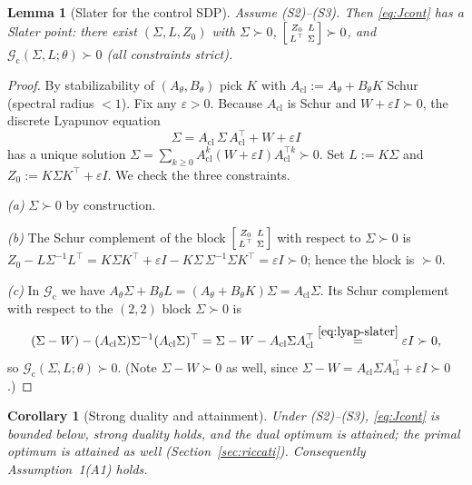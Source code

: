 \documentclass[11pt]{article}
\newtheorem{lemma}{Lemma}
\newtheorem{corollary}{Corollary}
\theoremstyle{definition}
\newcommand{\Acl}{A_{\mathrm{cl}}}
\newcommand{\Th}{\theta}
\newcommand{\eps}{\varepsilon}
\newcommand{\Sig}{\Sigma}
\begin{document}
\begin{lemma}[Slater for the control SDP]\label{lem:slater-cont}
Assume \textup{(S2)}--\textup{(S3)}. Then \eqref{eq:Jcont} has a Slater point:
there exist $(\Sig,L,Z_0)$ with $\Sig\succ0$,
$\begin{bsmallmatrix}Z_0&L\\L^\top&\Sig\end{bsmallmatrix}\succ0$, and
$\mathcal G_{\mathrm c}(\Sig,L;\Th)\succ0$ \textup{(}all constraints strict\textup{)}.
\end{lemma}

\begin{proof}
By stabilizability of $(A_\Th,B_\Th)$ pick $K$ with $\Acl:=A_\Th+B_\Th K$ Schur
(spectral radius $<1$). Fix any $\eps>0$. Because $\Acl$ is Schur and
$W+\eps I\succ0$, the discrete Lyapunov equation
\begin{equation}\label{eq:lyap-slater}
\Sig=\Acl\,\Sig\,\Acl^\top+W+\eps I
\end{equation}
has a unique solution $\Sig=\sum_{k\ge0}\Acl^{k}(W+\eps I)\Acl^{\top k}\succ0$.
Set $L:=K\Sig$ and $Z_0:=K\Sig K^\top+\eps I$. We check the three constraints.

\emph{(a)} $\Sig\succ0$ by construction.

\emph{(b)} The Schur complement of the block
$\begin{bsmallmatrix}Z_0&L\\L^\top&\Sig\end{bsmallmatrix}$ with respect to
$\Sig\succ0$ is $Z_0-L\Sig^{-1}L^\top=K\Sig K^\top+\eps I-K\Sig\,\Sig^{-1}\Sig
K^\top=\eps I\succ0$; hence the block is $\succ0$.

\emph{(c)} In $\mathcal G_{\mathrm c}$ we have
$A_\Th\Sig+B_\Th L=(A_\Th+B_\Th K)\Sig=\Acl\Sig$. Its Schur complement with
respect to the $(2,2)$ block $\Sig\succ0$ is
\[
(\Sig-W)-(\Acl\Sig)\Sig^{-1}(\Acl\Sig)^\top
=\Sig-W-\Acl\Sig\Acl^\top
\overset{\eqref{eq:lyap-slater}}{=}\eps I\succ0,
\]
so $\mathcal G_{\mathrm c}(\Sig,L;\Th)\succ0$. (Note $\Sig-W\succ0$ as well,
since $\Sig-W=\Acl\Sig\Acl^\top+\eps I\succ0$.)
\end{proof}

\begin{corollary}[Strong duality and attainment]\label{cor:duality}
Under \textup{(S2)}--\textup{(S3)}, \eqref{eq:Jcont} is bounded below, strong
duality holds, and the dual optimum is attained; the primal optimum is attained
as well \textup{(}Section~\ref{sec:riccati}\textup{)}. Consequently
Assumption~1(A1) holds.
\end{corollary}
\end{document}
